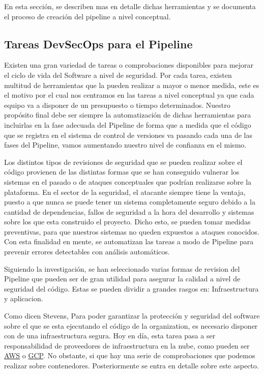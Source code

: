 \documentclass[12pt]{report} %
\begin{document}
En esta sección, se describen mas en detalle dichas herramientas y se documenta
el proceso de creación del pipeline a nivel conceptual.

\subsection{Tareas DevSecOps para el Pipeline}

Existen una gran variedad de tareas o comprobaciones disponibles para mejorar el 
ciclo de vida del Software a nivel de seguridad.
Por cada tarea, existen multitud de herramientas que la pueden realizar a mayor
o menor medida, este es el motivo por el cual nos centramos en las tareas a 
nivel conceptual ya que cada equipo va a disponer de un presupuesto o tiempo 
determinados.
Nuestro propósito final debe ser siempre la automatización de dichas
herramientas para incluirlas en la fase adecuada del Pipeline de forma que
a medida que el código que se registra en el sistema de control de versiones va 
pasando cada una de las fases del Pipeline, vamos aumentando nuestro nivel de 
confianza en el mismo.

Los distintos tipos de revisiones de seguridad que se pueden realizar sobre el
código provienen de las distintas formas que se han conseguido vulnerar los
sistemas en el pasado o de ataques conceptuales que podrían realizarse sobre la
plataforma.
En el sector de la seguridad, el atacante siempre tiene la ventaja, puesto a que
nunca se puede tener un sistema completamente seguro debido a la cantidad de
dependencias, fallos de seguridad a la hora del desarrollo y sistemas sobre los
que esta construido el proyecto.
Dicho esto, se pueden tomar medidas preventivas, para que nuestros sistemas no
queden expuestos a ataques conocidos.
Con esta finalidad en mente, se automatizan las tareas a modo de Pipeline para prevenir
errores detectables con análisis automáticos.

Siguiendo la investigación, se han seleccionado varias formas de revision del
Pipeline que pueden ser de gran utilidad para asegurar la calidad a nivel de
seguridad del código.
Estas se pueden dividir a grandes rasgos en: Infraestructura y aplicacion.

Como dicen \cite{Ensor2021} Stevens, Para poder garantizar la protección y
seguridad del software sobre el que se esta ejecutando el código de la
organization, es necesario disponer con de una infraestructura segura. 
Hoy en día, esta tarea pasa a ser responsabilidad de proveedores de
infraestructura en la nube, como pueden ser \href{https://aws.amazon.com/}{AWS}
o \href{https://console.cloud.google.com/}{GCP}.
No obstante, si que hay una serie de comprobaciones que podemos realizar 
sobre contenedores.
Posteriormente se entra en detalle sobre este aspecto.
\end{document}
